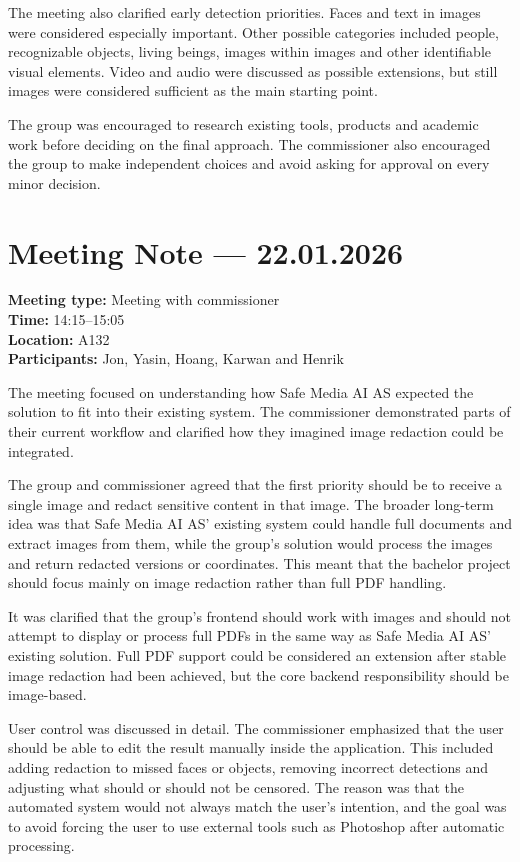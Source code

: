 The meeting also clarified early detection priorities. Faces and text in images were considered especially important. Other possible categories included people, recognizable objects, living beings, images within images and other identifiable visual elements. Video and audio were discussed as possible extensions, but still images were considered sufficient as the main starting point.

The group was encouraged to research existing tools, products and academic work before deciding on the final approach. The commissioner also encouraged the group to make independent choices and avoid asking for approval on every minor decision.

\section{Meeting Note --- 22.01.2026}
\label{app:meeting-2026-01-22}
\textbf{Meeting type:} Meeting with commissioner\\
\textbf{Time:} 14:15--15:05\\
\textbf{Location:} A132\\
\textbf{Participants:} Jon, Yasin, Hoang, Karwan and Henrik

The meeting focused on understanding how Safe Media AI AS expected the solution to fit into their existing system. The commissioner demonstrated parts of their current workflow and clarified how they imagined image redaction could be integrated.

The group and commissioner agreed that the first priority should be to receive a single image and redact sensitive content in that image. The broader long-term idea was that Safe Media AI AS' existing system could handle full documents and extract images from them, while the group's solution would process the images and return redacted versions or coordinates. This meant that the bachelor project should focus mainly on image redaction rather than full PDF handling.

It was clarified that the group's frontend should work with images and should not attempt to display or process full PDFs in the same way as Safe Media AI AS' existing solution. Full PDF support could be considered an extension after stable image redaction had been achieved, but the core backend responsibility should be image-based.

User control was discussed in detail. The commissioner emphasized that the user should be able to edit the result manually inside the application. This included adding redaction to missed faces or objects, removing incorrect detections and adjusting what should or should not be censored. The reason was that the automated system would not always match the user's intention, and the goal was to avoid forcing the user to use external tools such as Photoshop after automatic processing.

